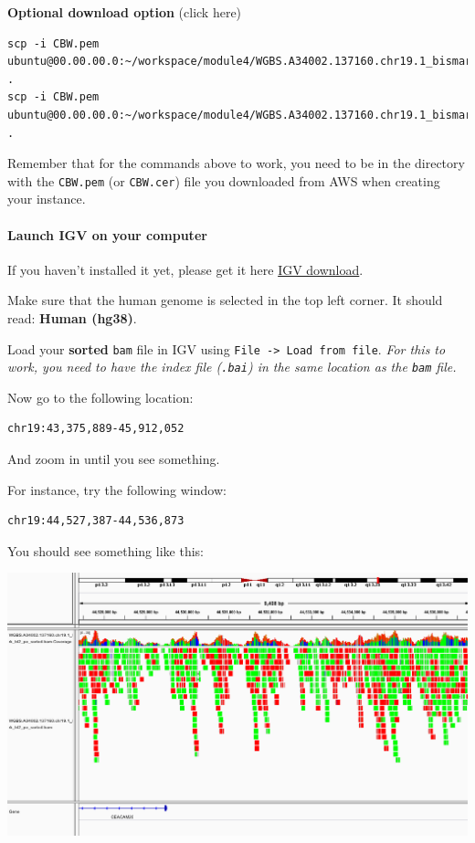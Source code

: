 \documentclass[
]{book}
\begin{document}
\textbf{Optional download option} (click here)

\begin{verbatim}
scp -i CBW.pem ubuntu@00.00.00.0:~/workspace/module4/WGBS.A34002.137160.chr19.1_bismark_bt2_pe_sorted.bam .
scp -i CBW.pem ubuntu@00.00.00.0:~/workspace/module4/WGBS.A34002.137160.chr19.1_bismark_bt2_pe_sorted.bam.bai .
\end{verbatim}

Remember that for the commands above to work, you need to be in the directory with the \texttt{CBW.pem} (or \texttt{CBW.cer}) file you downloaded from AWS when creating your instance.

\paragraph{Launch IGV on your computer}\label{launch-igv-on-your-computer}

If you haven't installed it yet, please get it here \href{http://software.broadinstitute.org/software/igv/download}{IGV download}.

Make sure that the human genome is selected in the top left corner. It should read: \textbf{Human (hg38)}.

Load your \textbf{sorted} \texttt{bam} file in IGV using \texttt{File\ -\textgreater{}\ Load\ from\ file}. \emph{For this to work, you need to have the index file (\texttt{.bai}) in the same location as the \texttt{bam} file.}

Now go to the following location:

\begin{verbatim}
chr19:43,375,889-45,912,052
\end{verbatim}

And zoom in until you see something.

For instance, try the following window:

\begin{verbatim}
chr19:44,527,387-44,536,873
\end{verbatim}

You should see something like this:

\includegraphics{./img/region2.png}
\end{document}
